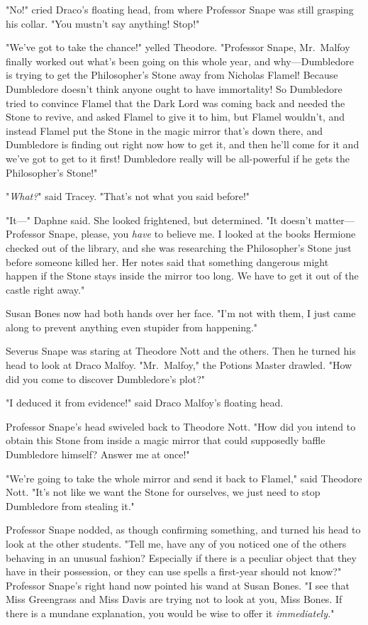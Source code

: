 "No!" cried Draco's floating head, from where Professor Snape was still
grasping his collar. "You mustn't say anything! Stop!"

"We've got to take the chance!" yelled Theodore. "Professor Snape, Mr.~Malfoy
finally worked out what's been going on this whole year, and why---Dumbledore
is trying to get the Philosopher's Stone away from Nicholas Flamel! Because
Dumbledore doesn't think anyone ought to have immortality! So Dumbledore tried
to convince Flamel that the Dark Lord was coming back and needed the Stone to
revive, and asked Flamel to give it to him, but Flamel wouldn't, and instead
Flamel put the Stone in the magic mirror that's down there, and Dumbledore is
finding out right now how to get it, and then he'll come for it and we've got
to get to it first! Dumbledore really will be all-powerful if he gets the
Philosopher's Stone!"

"\emph{What?}" said Tracey. "That's not what you said before!"

"It\mbox{---}" Daphne said. She looked frightened, but determined. "It doesn't
matter---Professor Snape, please, you \emph{have} to believe me. I looked at
the books Hermione checked out of the library, and she was researching the
Philosopher's Stone just before someone killed her. Her notes said that
something dangerous might happen if the Stone stays inside the mirror too long.
We have to get it out of the castle right away."

Susan Bones now had both hands over her face. "I'm not with them, I just came
along to prevent anything even stupider from happening."

Severus Snape was staring at Theodore Nott and the others. Then he turned his
head to look at Draco Malfoy. "Mr.~Malfoy," the Potions Master drawled. "How
did you come to discover Dumbledore's plot?"

"I deduced it from evidence!" said Draco Malfoy's floating head.

Professor Snape's head swiveled back to Theodore Nott. "How did you intend to
obtain this Stone from inside a magic mirror that could supposedly baffle
Dumbledore himself? Answer me at once!"

"We're going to take the whole mirror and send it back to Flamel," said
Theodore Nott. "It's not like we want the Stone for ourselves, we just need to
stop Dumbledore from stealing it."

Professor Snape nodded, as though confirming something, and turned his head to
look at the other students. "Tell me, have any of you noticed one of the others
behaving in an unusual fashion? Especially if there is a peculiar object that
they have in their possession, or they can use spells a first-year should not
know?" Professor Snape's right hand now pointed his wand at Susan Bones. "I see
that Miss Greengrass and Miss Davis are trying not to look at you, Miss Bones.
If there is a mundane explanation, you would be wise to offer it
\emph{immediately.}"

